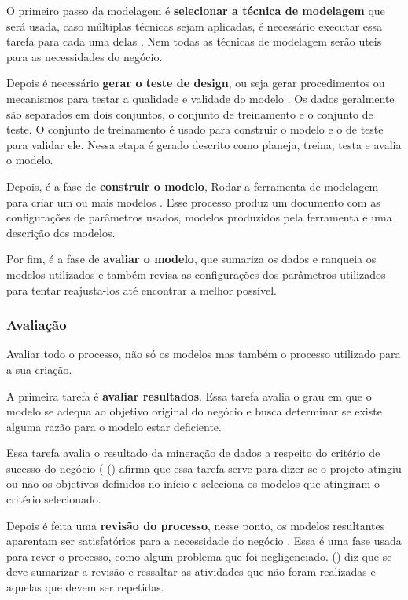 O primeiro passo da modelagem é \textbf{selecionar a técnica de modelagem} que será usada, caso múltiplas técnicas sejam aplicadas, é necessário executar essa tarefa para cada uma delas \citep{crispmanual}. Nem todas as técnicas de modelagem serão uteis para as necessidades do negócio.

Depois é necessário \textbf{gerar o teste de design}, ou seja gerar procedimentos ou mecanismos para testar a qualidade e validade do modelo \citep{crispmanual}. Os dados geralmente são separados em dois conjuntos, o conjunto de treinamento e o conjunto de teste. O conjunto de treinamento é usado para construir o modelo e o de teste para validar ele. Nessa etapa é gerado descrito como planeja, treina, testa e avalia o modelo.

Depois, é a fase de \textbf{construir o modelo}, Rodar a ferramenta de modelagem para criar um ou mais modelos \citep{crispmanual}. Esse processo produz um documento com as configurações de parâmetros usados, modelos produzidos pela ferramenta e uma descrição dos modelos.

Por fim, é a fase de \textbf{avaliar o modelo}, que sumariza os dados e ranqueia os modelos utilizados e também revisa as configurações dos parâmetros utilizados para tentar reajusta-los até encontrar a melhor possível.

\subsubsection{Avaliação}
Avaliar todo o processo, não só os modelos mas também o processo utilizado para a sua criação.

A primeira tarefa é \textbf{avaliar resultados}. Essa tarefa avalia o grau em que o modelo se adequa ao objetivo original do negócio e busca determinar se existe alguma razão para o modelo estar deficiente.

Essa tarefa avalia o resultado da mineração de dados a respeito do critério de sucesso do negócio (\citeauthor{dmfd} (\citeyear{dmfd}) afirma que essa tarefa serve para dizer se o projeto atingiu ou não os objetivos definidos no início e seleciona os modelos que atingiram o critério selecionado.

Depois é feita uma \textbf{revisão do processo}, nesse ponto, os modelos resultantes aparentam ser satisfatórios para a necessidade do negócio \citep{crispmanual}. Essa é uma fase usada para rever o processo, como algum problema que foi negligenciado. \citeauthor{crispmanual} (\citeyear{crispmanual}) diz que se deve sumarizar a revisão e ressaltar as atividades que não foram realizadas e aquelas que devem ser repetidas.

